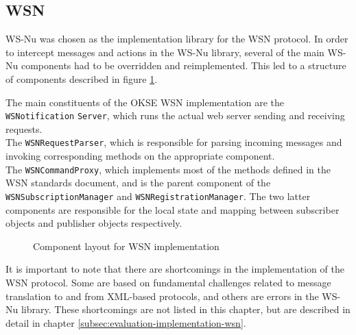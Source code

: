 \subsection{WSN}
\label{subsec:architecture_and_implementation-implementation-wsn}
WS-Nu was chosen as the implementation library for the WSN protocol.
In order to intercept messages and actions in the WS-Nu library, several of the main WS-Nu components had to be overridden and reimplemented. This led to a structure of components described in figure \ref{fig:wsnotification-server-structure}.

The main constituents of the OKSE WSN implementation are the \verb!WSNotification! \verb!Server!, which runs the actual web server sending and receiving requests. \\The \verb!WSNRequestParser!, which is responsible for parsing incoming messages and invoking corresponding methods on the appropriate component. \\The \verb!WSNCommandProxy!, which implements most of the methods defined in the WSN standards document, and is the parent component of the \verb!WSNSubscriptionManager! and \verb!WSNRegistrationManager!. The two latter components are responsible for the local state and mapping between subscriber objects and publisher objects respectively.

\begin{center}
  \begin{figure}[ht!]
    \caption{Component layout for WSN implementation}
    \label{fig:wsnotification-server-structure}
  \end{figure}
\end{center}

It is important to note that there are shortcomings in the implementation of the WSN protocol. Some are based on fundamental challenges related to message translation to and from XML-based protocols, and others are errors in the WS-Nu library. These shortcomings are not listed in this chapter, but are described in detail in chapter \ref{subsec:evaluation-implementation-wsn}.

